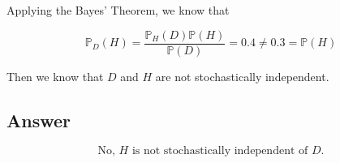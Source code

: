 \documentclass[12pt]{article}
\newcommand{\bP}{\mathbb{P}}
\begin{document}
\begin{enumerate}[start=1,label={\bfseries Part \arabic*:},leftmargin=0in]
			Applying the Bayes’ Theorem, we know that
			
			\[\bP_D(H) = \frac{\bP_H(D)\bP(H)}{\bP(D)} = 0.4 \ne 0.3 = \bP(H)\]
			
			Then we know that $D$ and $H$ are not stochastically independent.
		
		\subsection*{Answer}
		
			\[\boxed{\text{No, $H$ is not stochastically independent of $D$.}}\]
			
	\end{enumerate}
	
\end{document}
